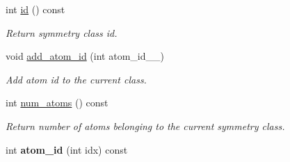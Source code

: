 \begin{DoxyCompactItemize}
\item 
int \hyperlink{classsirius_1_1_atom__symmetry__class_aa0d970d5de55b7e2f9e35c352dd7ee3a}{id} () const 
\begin{DoxyCompactList}\small\item\em Return symmetry class id. \end{DoxyCompactList}\item 
void \hyperlink{classsirius_1_1_atom__symmetry__class_a5931a51adda0182cf5a4048f8650dc3b}{add\+\_\+atom\+\_\+id} (int atom\+\_\+id\+\_\+\+\_\+)
\begin{DoxyCompactList}\small\item\em Add atom id to the current class. \end{DoxyCompactList}\item 
int \hyperlink{classsirius_1_1_atom__symmetry__class_a8d7b49eb4a24eb4bc9323d6eef6fd30b}{num\+\_\+atoms} () const 
\begin{DoxyCompactList}\small\item\em Return number of atoms belonging to the current symmetry class. \end{DoxyCompactList}\item 
\hypertarget{classsirius_1_1_atom__symmetry__class_a4b657e28f0e6acdace35fddc94c1238d}{}int {\bfseries atom\+\_\+id} (int idx) const \label{classsirius_1_1_atom__symmetry__class_a4b657e28f0e6acdace35fddc94c1238d}


\end{DoxyCompactItemize}

